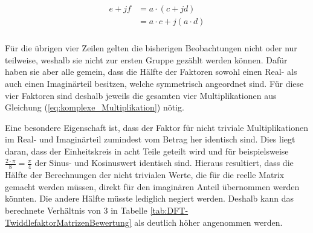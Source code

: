  \begin{align}\label{eq:halb_komplexe_Multiplikation}
 \begin{split}
  e + jf &= a \cdot (c + jd)\\
         &= a \cdot c + j(a \cdot d)\\
 \end{split}
 \end{align}
 
 Für die übrigen vier Zeilen gelten die bisherigen Beobachtungen nicht oder nur teilweise, weshalb sie nicht zur ersten Gruppe gezählt werden können.
 Dafür haben sie aber alle gemein, dass die Hälfte der Faktoren sowohl einen Real- als auch einen Imaginärteil besitzen, welche symmetrisch angeordnet sind.
 Für diese vier Faktoren sind deshalb jeweils die gesamten vier Multiplikationen aus Gleichung (\ref{eq:komplexe_Multiplikation}) nötig.

 Eine besondere Eigenschaft ist, dass der Faktor für nicht triviale Multiplikationen im Real- und Imaginärteil zumindest vom Betrag her identisch sind.
 Dies liegt daran, dass der Einheitskreis in acht Teile geteilt wird und für beispielsweise $\frac{2\cdot\pi}{8}=\frac{\pi}{4}$ der Sinus- und Kosinuswert identisch sind. 
 Hieraus resultiert, dass die Hälfte der Berechnungen der nicht trivialen Werte, die für die reelle Matrix gemacht werden müssen,
 direkt für den imaginären Anteil übernommen werden könnten. Die andere Hälfte müsste lediglich negiert werden. 
 Deshalb kann das berechnete Verhältnis von 3 in Tabelle \ref{tab:DFT-TwiddlefaktorMatrizenBewertung} als deutlich höher angenommen werden.
 



